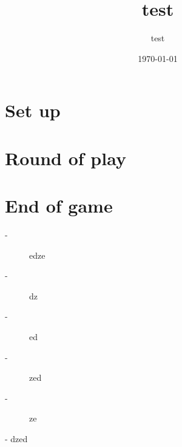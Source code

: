 \documentclass{article}%
\title{test}%
\author{test}%
\date{\today}%
\begin{document}
%
\pagestyle{empty}%
\normalsize%
\maketitle%
\section{ Set up
}%
\label{sec:Setup}%

%
\section{ Round of play
}%
\label{sec:Roundofplay}%

%
\section{ End of game
}%
\label{sec:Endofgame}%
\begin{description}%
\item[{-} ]%
%
 edze
%
\item[{-} ]%
%
 dz
%
\item[{-} ]%
%
 ed
%
\item[{-} ]%
%
 zed
%
\item[{-} ]%
%
 ze
%
\end{description}%
{-} dzed

%
\end{document}
